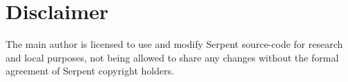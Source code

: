 \documentclass[twoside,a4paper,12pt,english]{anstrans}
\begin{document}
\section{Disclaimer}
The main author is licensed to use and modify Serpent source-code for research
and local purposes, not being allowed to share any changes without the formal
agreement of Serpent copyright holders.


\end{document}
